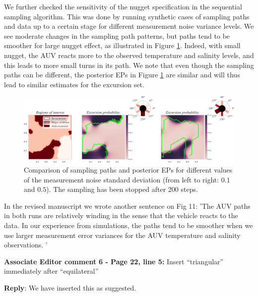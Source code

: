 \documentclass[a4paper]{article}
\newcounter{reviewer}
\def\aecom{\textbf{Associate Editor comment }}
\def\reply{\textbf{Reply}}
\begin{document}
We further checked the sensitivity of the nugget specification in the sequential sampling algorithm. This was done by running synthetic cases of sampling paths and data up to a certain stage for different measurement noise variance levels. We see moderate changes in the sampling path patterns, but paths tend to be smoother for large nugget effect, as illustrated in Figure \ref{fig:nugget_comparison}.
Indeed, with small nugget, the AUV reacts more to the observed temperature and salinity levels, and this leads to more small turns in its path. 
We note that even though the sampling paths can be different, the posterior EPs in Figure \ref{fig:nugget_comparison} are similar and will thus lead to similar estimates for the excursion set. %

\begin{figure}[h]
    \centering
    \includegraphics[scale=0.52]{ans_to_reviewers/merged_paths_2.png}
    \caption{Comparison of sampling paths and posterior EPs for different values of the measurement noise standard deviation (from left to right: $0.1$ and $0.5$). The sampling has been stopped after 200 steps.}
    \label{fig:nugget_comparison}
\end{figure}
In the revised manuscript we wrote another sentence on Fig 11: 'The AUV paths in both runs are relatively
winding in the sense that the vehicle reacts to the data. In our
experience from simulations, the paths tend to be smoother when we
use larger measurement error variances for the AUV temperature and salinity observations. '

\vspace{5mm}
\noindent \aecom \textbf{6 - Page 22, line 5:}  Insert “triangular” immediately after “equilateral”

\vspace{5mm}
\reply: We have inserted this as suggested. 

\vspace{1em}


\footnotesize



\end{document}
